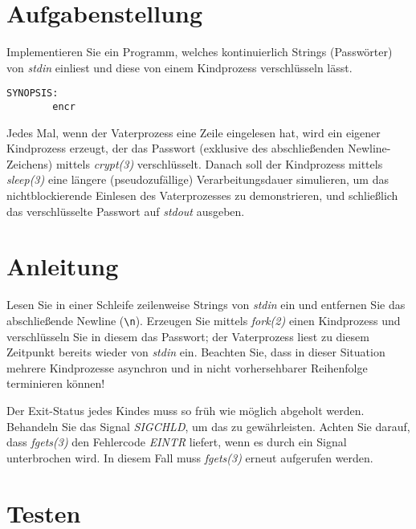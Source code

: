




\section*{Aufgabenstellung}

Implementieren Sie ein Programm, welches kontinuierlich Strings
(Passwörter) von \emph{stdin} einliest und diese von einem Kindprozess
verschlüsseln lässt.

\begin{verbatim}
SYNOPSIS:
        encr
\end{verbatim}

Jedes Mal, wenn der Vaterprozess eine Zeile eingelesen hat, wird ein
eigener Kindprozess erzeugt, der das Passwort (exklusive des
abschließenden Newline-Zeichens) mittels \emph{crypt(3)}
verschlüsselt. Danach soll der Kindprozess mittels \emph{sleep(3)}
eine längere (pseudozufällige) Verarbeitungsdauer simulieren, um das
nichtblockierende Einlesen des Vaterprozesses zu demonstrieren, und
schließlich das verschlüsselte Passwort auf \emph{stdout} ausgeben.

\section*{Anleitung}

Lesen Sie in einer Schleife zeilenweise Strings von \emph{stdin} ein
und entfernen Sie das abschließende Newline (\verb+\n+). Erzeugen Sie
mittels \emph{fork(2)} einen Kindprozess und verschlüsseln Sie in
diesem das Passwort; der Vaterprozess liest zu diesem Zeitpunkt
bereits wieder von \emph{stdin} ein. Beachten Sie, dass in dieser
Situation mehrere Kindprozesse asynchron und in nicht vorhersehbarer
Reihenfolge terminieren können!

Der Exit-Status jedes Kindes muss so früh wie möglich abgeholt werden.
Behandeln Sie das Signal {\em SIGCHLD}, um das zu gewährleisten.
Achten Sie darauf, dass {\em fgets(3)} den Fehlercode {\em EINTR}
liefert, wenn es durch ein Signal unterbrochen wird. In diesem Fall
muss {\em fgets(3)} erneut aufgerufen werden.

\section*{Testen}

